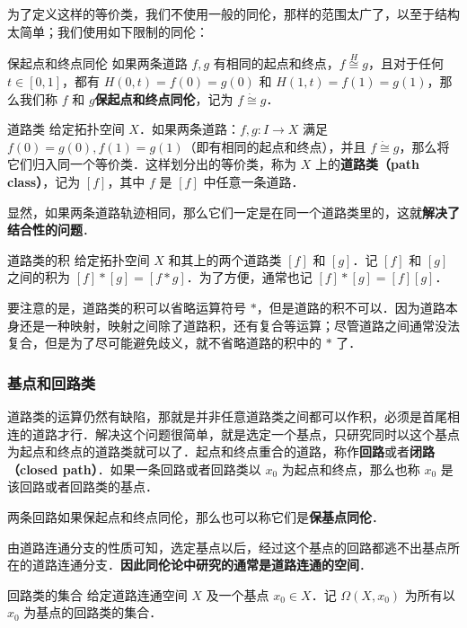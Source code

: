 为了定义这样的等价类，我们不使用一般的同伦，那样的范围太广了，以至于结构太简单；我们使用如下限制的同伦：

\begin{definition}{保起点和终点同伦}
如果两条道路 $f, g$ 有相同的起点和终点，$f\overset{H}{\cong}g$，且对于任何 $t\in [0, 1]$，都有 $H(0, t)=f(0)=g(0)$ 和 $H(1, t)=f(1)=g(1)$，那么我们称 $f$ 和 $g$\textbf{保起点和终点同伦}，记为 $f\dot{\cong}g$．
\end{definition}

\begin{definition}{道路类}
给定拓扑空间 $X$．如果两条道路：$f, g:I\rightarrow X$ 满足 $f(0)=g(0), f(1)=g(1)$（即有相同的起点和终点），并且 $f\dot{\cong}g$，那么将它们归入同一个等价类．这样划分出的等价类，称为 $X$ 上的\textbf{道路类（path class）}，记为 $[f]$，其中 $f$ 是 $[f]$ 中任意一条道路．
\end{definition}

显然，如果两条道路轨迹相同，那么它们一定是在同一个道路类里的，这就\textbf{解决了结合性的问题}．

\begin{definition}{道路类的积}
给定拓扑空间 $X$ 和其上的两个道路类 $[f]$ 和 $[g]$．记 $[f]$ 和 $[g]$ 之间的积为 $[f]*[g]=[f*g]$．为了方便，通常也记 $[f]*[g]=[f][g]$．
\end{definition}

要注意的是，道路类的积可以省略运算符号 $*$，但是道路的积不可以．因为道路本身还是一种映射，映射之间除了道路积，还有复合等运算；尽管道路之间通常没法复合，但是为了尽可能避免歧义，就不省略道路的积中的 $*$ 了．

\subsubsection{基点和回路类}

道路类的运算仍然有缺陷，那就是并非任意道路类之间都可以作积，必须是首尾相连的道路才行．解决这个问题很简单，就是选定一个基点，只研究同时以这个基点为起点和终点的道路类就可以了．起点和终点重合的道路，称作\textbf{回路}或者\textbf{闭路（closed path）}．如果一条回路或者回路类以 $x_0$ 为起点和终点，那么也称 $x_0$ 是该回路或者回路类的基点．

两条回路如果保起点和终点同伦，那么也可以称它们是\textbf{保基点同伦}．

由道路连通分支的性质可知，选定基点以后，经过这个基点的回路都逃不出基点所在的道路连通分支．\textbf{因此同伦论中研究的通常是道路连通的空间}．

\begin{definition}{回路类的集合}
给定道路连通空间 $X$ 及一个基点 $x_0\in X$．记 $\Omega(X, x_0)$ 为所有以 $x_0$ 为基点的回路类的集合．
\end{definition}

